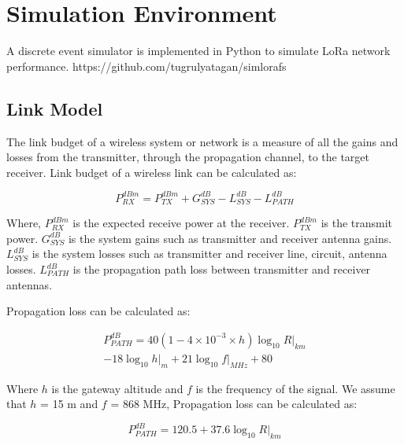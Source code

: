 \documentclass[conference]{IEEEtran}
\begin{document}
\section{Simulation Environment} \label{Simulation Environment}
\par [TODO] A discrete event simulator is implemented in Python to simulate LoRa network performance. https://github.com/tugrulyatagan/simlorafs

\subsection{Link Model}
\par [TODO] 

The link budget of a wireless system or network is a measure of all the gains and losses from the transmitter, through the propagation channel, to the target receiver. Link budget of a wireless link can be calculated as:

\begin{equation} \label{eq:expected_rx_power}
P^{dBm}_{RX} = P^{dBm}_{TX} + G^{dB}_{SYS} - L^{dB}_{SYS} - L^{dB}_{PATH}
\end{equation}

\par Where, $P^{dBm}_{RX}$ is the expected receive power at the receiver. $P^{dBm}_{TX}$ is the transmit power. $G^{dB}_{SYS}$ is the system gains such as transmitter and receiver antenna gains. $L^{dB}_{SYS}$ is the system losses such as transmitter and receiver line, circuit, antenna losses. $L^{dB}_{PATH}$ is the propagation path loss between transmitter and receiver antennas.

\par Propagation loss can be calculated as:

\begin{equation} \label{eq:propagation_loss}
\begin{split}
P^{dB}_{PATH} = 40(1 - 4 \times 10^{-3} \times h){\log_{10} R|_{km}} \\
- 18 {\log_{10} h|_{m}} + 21 {\log_{10} f|_{MHz}} + 80
\end{split}
\end{equation}

\par Where $h$ is the gateway altitude and $f$ is the frequency of the signal. We assume that $h$ = 15 m and $f$ = 868 MHz, Propagation loss can be calculated as:

\begin{equation} \label{eq:propagation_loss}
P^{dB}_{PATH} = 120.5 + 37.6 {\log_{10} R|_{km}}
\end{equation}
\end{document}
